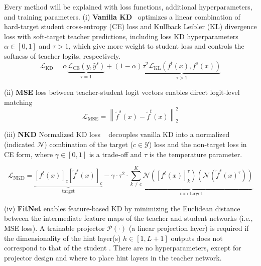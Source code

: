 \documentclass[runningheads]{llncs}
\begin{document}
Every method will be explained with loss functions, additional hyperparameters, and training parameters.
\noindent(i) \textbf{Vanilla KD}~\cite{hinton2015distilling} optimizes a linear combination of hard-target student cross-entropy (CE) loss and Kullback Leibler (KL) divergence loss with soft-target teacher predictions, including loss KD hyperparameters $\alpha \in [0,1]$ and $\tau > 1$, which give more weight to student loss and controls the softness of teacher logits, respectively. %
\begin{equation*}
    \mathcal{L}_{\mathrm{KD}}= \alpha \underbrace{\mathcal{L}_{\mathrm{CE}}\left(y, \hat{y}^s\right)}_{\tau=1}+(1-\alpha)\underbrace{\tau^2 \mathcal{L}_{\mathrm{KL}}\left(f^t(x), f^s(x)\right)}_{\tau>1}
\end{equation*}


\noindent(ii) \textbf{MSE} loss between teacher-student logit vectors enables direct logit-level matching \cite{kim2021comparing}
\begin{equation*}
    \mathcal{L}_{\mathrm{MSE}}=\left\|\tilde{f}^{s}\left(x\right)-\tilde{f}^{t}\left(x\right)\right\|_{2}^{2}
\end{equation*}

\noindent(iii) \textbf{NKD} Normalized KD loss ~\cite{yang2023knowledge} decouples vanilla KD into a normalized (indicated $\mathcal{N}$) combination of the target ($c \in \mathcal{Y}$) loss and the non-target loss in CE form, %
where $\gamma \in [0,1]$ is a trade-off and $\tau$ is the temperature parameter.

\begin{equation*}
        \mathcal{L}_{\mathrm{NKD}}= \underbrace{[f^t(x)]_c [\tilde{f}^s(x)]_c}_{\text{target}}-\gamma \cdot \tau^2 \cdot \underbrace{\sum_{k \neq c}^K \mathcal{N}\left([f^t(x)]_k^\tau\right) \left(\mathcal{N}\left(\tilde{f}^s(x)^\tau\right)\right)}_{\text{non-target}}
\end{equation*}

\noindent(iv) \textbf{FitNet} \cite{romero2014fitnets} enables feature-based KD by minimizing the Euclidean distance between the intermediate feature maps of the teacher and student networks (i.e., MSE loss). A trainable projector $\mathcal{P}(\cdot)$ (\eg a linear projection layer) is required if the dimensionality of the hint layer(s) $h \in [1, L+1]$ outputs does not correspond to that of the student
. There are no hyperparameters, except for projector design and where to place hint layers in the teacher network.
\end{document}
